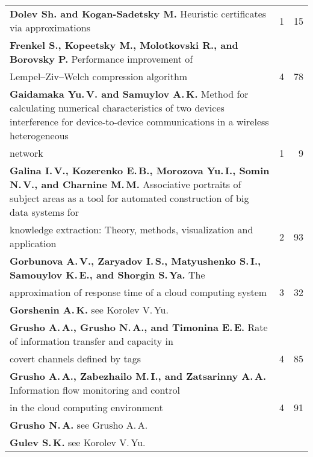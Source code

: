 {\begin{tabular}{p{399pt}rr}
\textbf{Dolev Sh. and Kogan-Sadetsky M.} Heuristic certificates via
approximations&1&15\\
\textbf{Frenkel S., Kopeetsky M., Molotkovski R., and Borovsky P.} Performance
improvement of\linebreak
\\[-12pt]
\hspace*{21pt}Lempel--Ziv--Welch compression algorithm&4&78\\
\hangindent=21pt\noindent\textbf{Gaidamaka Yu.\,V. and Samuylov A.\,K.} Method for calculating numerical
characteristics of two devices
interference for device-to-device communications in a
wireless heterogeneous\linebreak
\\[-12pt]
\hspace*{21pt}network&1&9\\
\hangindent=21pt\noindent\textbf{Galina I.\,V., Kozerenko E.\,B., Morozova Yu.\,I., Somin N.\,V.,
and Charnine M.\,M.} Associative portraits of subject areas as a tool for
automated construction of big data systems for\linebreak
\\[-12pt]
\hspace*{21pt}knowledge extraction: Theory,
methods, visualization and application&2&93\\
\textbf{Gorbunova A.\,V., Zaryadov I.\,S., Matyushenko S.\,I., Samouylov
K.\,E., and Shorgin S.\,Ya.} The\linebreak
\\[-12pt]
\hspace*{21pt}approximation of response time of a cloud
computing system&3&32\\
\textbf{Gorshenin A.\,K.} see Korolev V.\,Yu.&&\\
\textbf{Grusho A.\,A., Grusho N.\,A., and Timonina E.\,E.} Rate of information
transfer and capacity in\linebreak
\\[-12pt]
\hspace*{21pt}covert channels defined by tags&4&85\\
\textbf{Grusho A.\,A., Zabezhailo M.\,I., and Zatsarinny A.\,A.} Information flow
monitoring and control\linebreak
\\[-12pt]
\hspace*{21pt}in the cloud computing environment&4&91\\
\textbf{Grusho N.\,A.} see Grusho A.\,A.&&\\
\textbf{Gulev S.\,K.} see Korolev V.\,Yu.&&\\

\end{tabular}}
